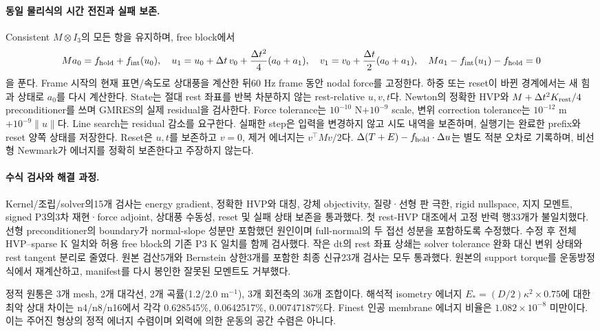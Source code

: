 \documentclass[10pt]{article}
\begin{document}
\paragraph{동일 물리식의 시간 전진과 실패 보존.}
Consistent \(M\otimes I_3\)의 모든 항을 유지하며, free block에서
\begin{equation}
 Ma_0=f_{\rm hold}+f_{\rm int}(u_0),\quad
 u_1=u_0+\Delta t\,v_0+\frac{\Delta t^2}{4}(a_0+a_1),\quad
 v_1=v_0+\frac{\Delta t}{2}(a_0+a_1),\quad
 Ma_1-f_{\rm int}(u_1)-f_{\rm hold}=0
 \label{eq:r1-p3-shell-newmark}
\end{equation}
을 푼다. Frame 시작의 현재 표면/속도로 상대풍을 계산한 뒤60 Hz frame 동안 nodal force를 고정한다.
하중 또는 reset이 바뀐 경계에서는 새 힘과 상태로 \(a_0\)를 다시 계산한다.
State는 절대 rest 좌표를 반복 차분하지 않는 rest-relative \(u,v,t\)다.
Newton의 정확한 HVP와 \(M+\Delta t^2K_{\rm rest}/4\) preconditioner를 쓰며 GMRES의 실제 residual을 검사한다.
Force tolerance는 \(10^{-10}\) N\(+10^{-9}\) scale, 변위 correction tolerance는
\(10^{-12}\) m\(+10^{-9}\|u\|\)다. Line search는 residual 감소를 요구한다.
실패한 step은 입력을 변경하지 않고 시도 내역을 보존하며, 실행기는 완료한 prefix와 reset 양쪽 상태를 저장한다.
Reset은 \(u,t\)를 보존하고 \(v=0\), 제거 에너지는 \(v^\top Mv/2\)다.
\(\Delta(T+E)-f_{\rm hold}\cdot\Delta u\)는 별도 적분 오차로 기록하며,
비선형 Newmark가 에너지를 정확히 보존한다고 주장하지 않는다.

\paragraph{수식 검사와 해결 과정.}
Kernel/조립/solver의15개 검사는 energy gradient, 정확한 HVP와 대칭,
강체 objectivity, 질량·선형 판 극한, rigid nullspace, 지지 모멘트,
signed P3의3차 재현·force adjoint, 상대풍 수동성, reset 및 실패 상태 보존을 통과했다.
첫 rest-HVP 대조에서 고정 반력 행33개가 불일치했다. 선형 preconditioner의 boundary가
normal-slope 성분만 포함했던 원인이며 full-normal의 두 접선 성분을 포함하도록 수정했다.
수정 후 전체 HVP--sparse K 일치와 허용 free block의 기존 P3 K 일치를 함께 검사했다.
작은 dt의 rest 좌표 상쇄는 solver tolerance 완화 대신 변위 상태와 rest tangent 분리로 줄였다.
원본 검산5개와 Bernstein 상한3개를 포함한 최종 신규23개 검사는 모두 통과했다.
원본의 support torque를 운동방정식에서 재계산하고, manifest를 다시 봉인한 잘못된 모멘트도 거부했다.

정적 원통은 3개 mesh, 2개 대각선, 2개 곡률(1.2/2.0 m$^{-1}$), 3개 회전축의 36개 조합이다.
해석적 isometry 에너지 \(E_*=(D/2)\kappa^2\times0.75\)에 대한 최악 상대 차이는
n4/n8/n16에서 각각 0.628545\%, 0.0642517\%, 0.00747187\%다.
Finest 인공 membrane 에너지 비율은 \(1.082\times10^{-8}\) 미만이다.
이는 주어진 형상의 정적 에너지 수렴이며 외력에 의한 운동의 공간 수렴은 아니다.
\end{document}
